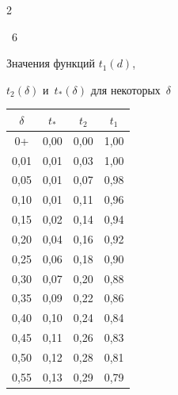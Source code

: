\begin{multicols}{2}


\noindent %


\begin{center}


\parbox{74mm}{{\tablename~6}\ \ \small{Значения функций $t_1(d)$,


$t_2(\delta)$ и~$t_*(\delta)$ для некоторых~$\delta$}}


\end{center}







{\small


\begin{center}


\tabcolsep=18pt


\begin{tabular}{|c|c|c|c|}


\hline


$\delta$ & $t_*$ & $t_2$ & $t_1$ \\


\hline


 0+   & 0,00 & 0,00 & 1,00 \\


 0,01 & 0,01 & 0,03 & 1,00 \\


 0,05 & 0,01 & 0,07 & 0,98 \\


 0,10 & 0,01 & 0,11 & 0,96 \\


 0,15 & 0,02 & 0,14 & 0,94 \\


 0,20 & 0,04 & 0,16 & 0,92 \\


 0,25 & 0,06 & 0,18 & 0,90 \\


 0,30 & 0,07 & 0,20 & 0,88 \\


 0,35 & 0,09 & 0,22 & 0,86 \\


 0,40 & 0,10 & 0,24 & 0,84 \\


 0,45 & 0,11 & 0,26 & 0,83 \\


 0,50 & 0,12 & 0,28 & 0,81 \\


 0,55 & 0,13 & 0,29 & 0,79 \\



\end{tabular}
\end{center}}
\end{multicols}
